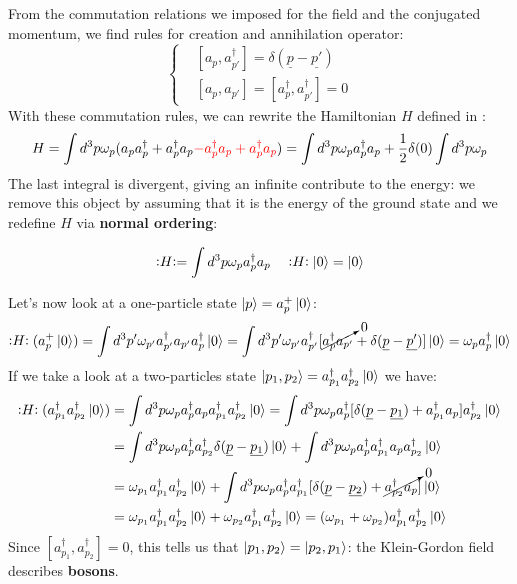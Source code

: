 \documentclass[../main.tex]{subfiles}
\begin{document}
From the commutation relations we imposed for the field and the conjugated momentum, we find rules for creation and annihilation operator:
\[
\left\{
\begin{aligned}
&[a_p,a^\dagger_{p'}]=\delta(\underline{p}-\underline{p'})\\
&[a_p,a_{p'}]=[a^\dagger_p,a^\dagger_{p'}]=0
\end{aligned}
\right.
\]
With these commutation rules, we can rewrite the Hamiltonian $H$ defined in :
\[
H=\int d^3p\omega_p(a_pa^\dagger_p+a^\dagger_pa_p{\color{red}-a^\dagger_pa_p+a^\dagger_pa_p})=\int d^3p\omega_pa_p^\dagger a_p+\frac{1}{2}\delta(0)\int d^3p\omega_p
\]
The last integral is divergent, giving an infinite contribute to the energy: we remove this object by assuming that it is the energy of the ground state and we redefine $H$ via \textbf{normal ordering}:
\begin{kaobox}[frametitle=Normal ordering of the Hamiltonian]
\[
\vcentcolon\mathrel{H}\vcentcolon=\int d^3p\omega_pa_p^\dagger a_p \quad \vcentcolon\mathrel{H}\vcentcolon\ket{0}=\ket{0}
\]
\end{kaobox}
Let's now look at a one-particle state $\ket{p}=a^+_p\ket{0}$:
\[
\vcentcolon\mathrel{H}\vcentcolon(a_p^+\ket{0})=\int d^3p'\omega_{p'}a_{p'}^\dagger a_{p'}a_p^\dagger\ket{0}=\int d^3p'\omega_{p'}a^\dagger_{p'}[\cancelto{0}{a_p^\dagger a_{p'}}+\delta(\underline{p}-\underline{p'})]\ket{0}=\omega_pa^\dagger_p\ket{0}
\]
If we take a look at a two-particles state $\ket{p_1,p_2}=a^\dagger_{p_1}a^\dagger_{p_2}\ket{0}$ we have:
\begin{align*}
\vcentcolon\mathrel{H}\vcentcolon(a^\dagger_{p_1}a^\dagger_{p_2}\ket{0})&=\int d^3p\omega_pa^\dagger_pa_pa^\dagger_{p_1}a^\dagger_{p_2}\ket{0}=\int d^3p\omega_pa^\dagger_p[\delta(\underline{p}-\underline{p_1})+a^\dagger_{p_1}a_p]a^\dagger_{p_2}\ket{0}\\
&=\int d^3p\omega_pa^\dagger_pa^\dagger_{p_2}\delta(\underline{p}-\underline{p_1})\ket{0}+\int d^3p\omega_pa^\dagger_pa^\dagger_{p_1}a_pa^\dagger_{p_2}\ket{0}\\
&=\omega_{p_1}a^\dagger_{p_1}a^\dagger_{p_2}\ket{0}+\int d^3p\omega_pa^\dagger_pa^\dagger_{p_1}[\delta(\underline{p}-\underline{p_2})+\cancelto{0}{a^\dagger_{p_2}a_p}]\ket{0}\\
&=\omega_{p_1}a^\dagger_{p_1}a^\dagger_{p_2}\ket{0}+\omega_{p_2}a^\dagger_{p_1}a^\dagger_{p_2}\ket{0}=(\omega_{p_1}+\omega_{p_2})a^\dagger_{p_1}a^\dagger_{p_2}\ket{0}
\end{align*}
Since $[a^\dagger_{p_1},a^\dagger_{p_2}]=0$, this tells us that $\ket{p_1,p_2}=\ket{p_2,p_1}$: the Klein-Gordon field describes \textbf{bosons}.
\end{document}
